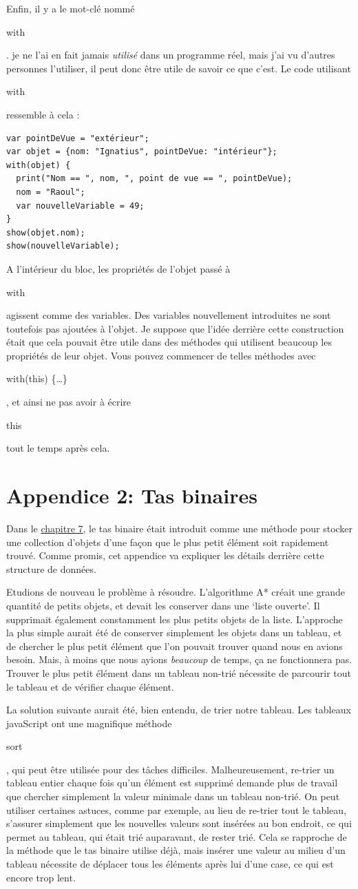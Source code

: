 \documentclass{FramateX}
\renewcommand{\texttt}[1]{\begin{sffamily}{#1}\end{sffamily}}
\begin{document}
Enfin, il y a le mot-clé nommé \texttt{with}. je ne l'ai en fait jamais
\emph{utilisé} dans un programme réel, mais j'ai vu d'autres personnes
l'utiliser, il peut donc être utile de savoir ce que c'est. Le code
utilisant \texttt{with} ressemble à cela :

\begin{lstlisting}
var pointDeVue = "extérieur";
var objet = {nom: "Ignatius", pointDeVue: "intérieur"};
with(objet) {
  print("Nom == ", nom, ", point de vue == ", pointDeVue);
  nom = "Raoul";
  var nouvelleVariable = 49;
}
show(objet.nom);
show(nouvelleVariable);
\end{lstlisting}
A l'intérieur du bloc, les propriétés de l'objet passé à \texttt{with}
agissent comme des variables. Des variables nouvellement introduites ne
sont toutefois pas ajoutées à l'objet. Je suppose que l'idée derrière
cette construction était que cela pouvait être utile dans des méthodes
qui utilisent beaucoup les propriétés de leur objet. Vous pouvez
commencer de telles méthodes avec \texttt{with(this) \{\ldots{}\}}, et
ainsi ne pas avoir à écrire \texttt{this} tout le temps après cela.

\section{Appendice 2: Tas binaires}

Dans le \href{chapter7.html}{chapitre 7}, le tas binaire était introduit
comme une méthode pour stocker une collection d'objets d'une façon que
le plus petit élément soit rapidement trouvé. Comme promis, cet
appendice va expliquer les détails derrière cette structure de données.

Etudions de nouveau le problème à résoudre. L'algorithme A* créait une
grande quantité de petits objets, et devait les conserver dans une
`liste ouverte'. Il supprimait également constamment les plus petits
objets de la liste. L'approche la plus simple aurait été de conserver
simplement les objets dans un tableau, et de chercher le plus petit
élément que l'on pouvait trouver quand nous en avions besoin. Mais, à
moins que nous ayions \emph{beaucoup} de temps, ça ne fonctionnera pas.
Trouver le plus petit élément dans un tableau non-trié nécessite de
parcourir tout le tableau et de vérifier chaque élément.

La solution suivante aurait été, bien entendu, de trier notre tableau.
Les tableaux javaScript ont une magnifique méthode \texttt{sort}, qui
peut être utilisée pour des tâches difficiles. Malheureusement, re-trier
un tableau entier chaque fois qu'un élément est supprimé demande plus de
travail que chercher simplement la valeur minimale dans un tableau
non-trié. On peut utiliser certaines astuces, comme par exemple, au lieu
de re-trier tout le tableau, s'assurer simplement que les nouvelles
valeurs sont insérées au bon endroit, ce qui permet au tableau, qui
était trié auparavant, de rester trié. Cela se rapproche de la méthode
que le tas binaire utilise déjà, mais insérer une valeur au milieu d'un
tableau nécessite de déplacer tous les éléments après lui d'une case, ce
qui est encore trop lent.
\end{document}
